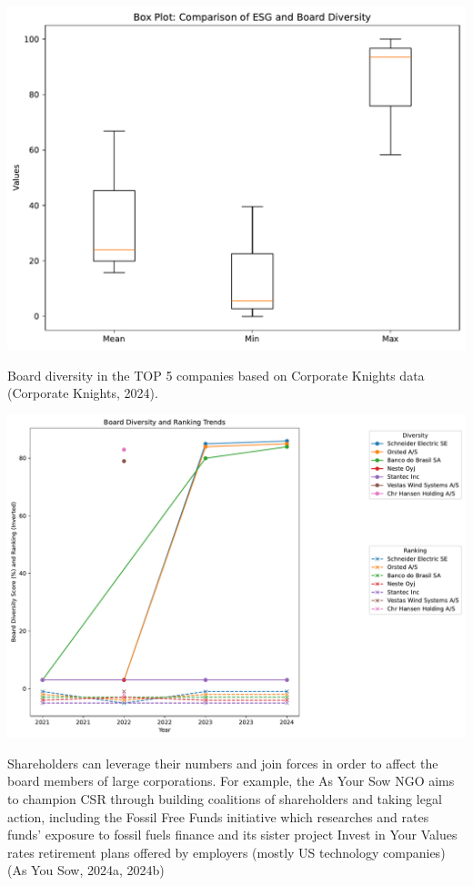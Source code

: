 \documentclass[
  letterpaper,
  DIV=11,
  numbers=noendperiod]{scrartcl}
\begin{document}
\includegraphics{_thesis_files/figure-pdf/cell-57-output-3.pdf}

Board diversity in the TOP 5 companies based on Corporate Knights data
(Corporate Knights, 2024).

\includegraphics{_thesis_files/figure-pdf/cell-58-output-1.pdf}

Shareholders can leverage their numbers and join forces in order to
affect the board members of large corporations. For example, the As Your
Sow NGO aims to champion CSR through building coalitions of shareholders
and taking legal action, including the Fossil Free Funds initiative
which researches and rates funds' exposure to fossil fuels finance and
its sister project Invest in Your Values rates retirement plans offered
by employers (mostly US technology companies) (As You Sow, 2024a, 2024b)
\end{document}

